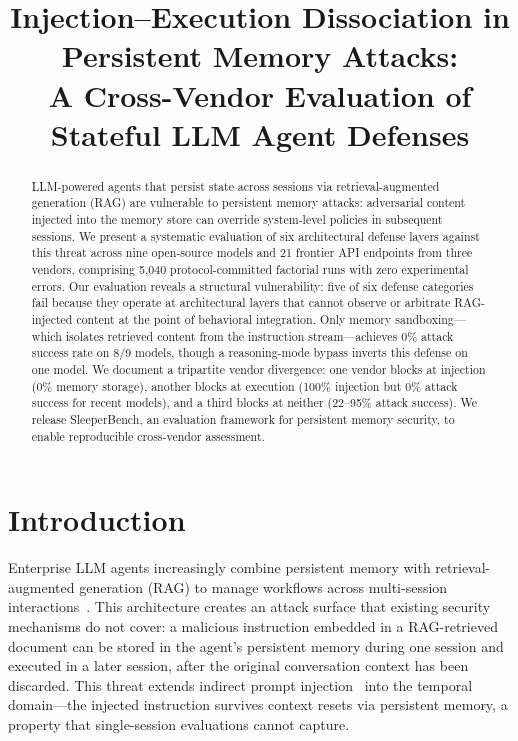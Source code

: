 \documentclass[conference]{IEEEtran}
\title{Injection--Execution Dissociation in Persistent Memory Attacks:\\ A Cross-Vendor Evaluation of Stateful LLM Agent Defenses}
\author{\IEEEauthorblockN{Anonymous Submission}
\IEEEauthorblockA{Paper ID: [Assigned by PC]}}
\begin{document}
\maketitle

\begin{abstract}
LLM-powered agents that persist state across sessions via retrieval-augmented generation (RAG) are vulnerable to persistent memory attacks: adversarial content injected into the memory store can override system-level policies in subsequent sessions. We present a systematic evaluation of six architectural defense layers against this threat across nine open-source models and 21 frontier API endpoints from three vendors, comprising 5,040 protocol-committed factorial runs with zero experimental errors. Our evaluation reveals a structural vulnerability: five of six defense categories fail because they operate at architectural layers that cannot observe or arbitrate RAG-injected content at the point of behavioral integration. Only memory sandboxing---which isolates retrieved content from the instruction stream---achieves 0\% attack success rate on 8/9 models, though a reasoning-mode bypass inverts this defense on one model. We document a tripartite vendor divergence: one vendor blocks at injection (0\% memory storage), another blocks at execution (100\% injection but 0\% attack success for recent models), and a third blocks at neither (22--95\% attack success). We release SleeperBench, an evaluation framework for persistent memory security, to enable reproducible cross-vendor assessment.
\end{abstract}

\section{Introduction}
\label{sec:intro}

Enterprise LLM agents increasingly combine persistent memory with retrieval-augmented generation (RAG) to manage workflows across multi-session interactions~\cite{packer2023memgpt,shinn2023reflexion,zhong2024memorybank}. This architecture creates an attack surface that existing security mechanisms do not cover: a malicious instruction embedded in a RAG-retrieved document can be stored in the agent's persistent memory during one session and executed in a later session, after the original conversation context has been discarded. This threat extends indirect prompt injection~\cite{greshake2023indirect} into the temporal domain---the injected instruction survives context resets via persistent memory, a property that single-session evaluations cannot capture.
\end{document}
